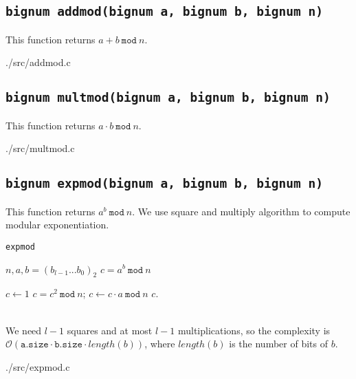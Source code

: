 \subsection{\texttt{bignum addmod(bignum a, bignum b, bignum n)}}
This function returns $a + b\ \texttt{mod}\ n$.

{./src/addmod.c}

\subsection{\texttt{bignum multmod(bignum a, bignum b, bignum n)}}
This function returns $a \cdot b\ \texttt{mod}\ n$.

{./src/multmod.c}

\subsection{\texttt{bignum expmod(bignum a, bignum b, bignum n)}}
This function returns $a^b\ \texttt{mod}\ n$.
We use square and multiply algorithm to compute modular exponentiation.
\begin{algorithm} 
\caption{\texttt{expmod}}
  \begin{algorithmic}[1]
    \Require $n, a, b = (b_{l-1}...b_0)_2$
    \Ensure $c = a^b \ \texttt{mod} \ n$

    \State $c \gets 1$
      \State $c = c^2\ \texttt{mod} \ n$;
        \State $c \gets c \cdot a\ \texttt{mod}\ n$
      \EndIf
    \EndFor
    \State \Return $c$.
  \end{algorithmic}
\end{algorithm}\\
We need $l-1$ squares and at most $l-1$ multiplications, so the complexity is
$\mathcal{O}(\texttt{a.size} \cdot \texttt{b.size} \cdot length(b))$, where
$length(b)$ is the number of bits of $b$.

{./src/expmod.c}

